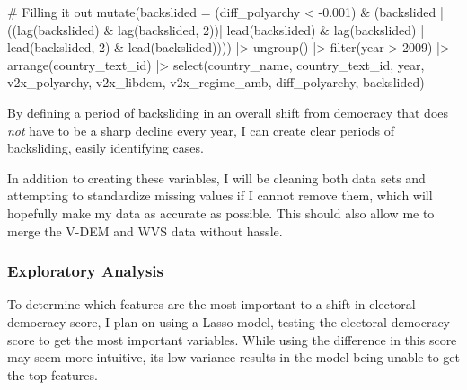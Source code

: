 \documentclass[
  letterpaper,
  DIV=11,
  numbers=noendperiod]{scrartcl}
\newenvironment{Shaded}{\begin{snugshade}}{\end{snugshade}}
\newcommand{\AttributeTok}[1]{\textcolor[rgb]{0.40,0.45,0.13}{#1}}
\newcommand{\CommentTok}[1]{\textcolor[rgb]{0.37,0.37,0.37}{#1}}
\newcommand{\DecValTok}[1]{\textcolor[rgb]{0.68,0.00,0.00}{#1}}
\newcommand{\FloatTok}[1]{\textcolor[rgb]{0.68,0.00,0.00}{#1}}
\newcommand{\FunctionTok}[1]{\textcolor[rgb]{0.28,0.35,0.67}{#1}}
\newcommand{\NormalTok}[1]{\textcolor[rgb]{0.00,0.23,0.31}{#1}}
\newcommand{\SpecialCharTok}[1]{\textcolor[rgb]{0.37,0.37,0.37}{#1}}
\begin{document}
\begin{Shaded}
\begin{Highlighting}[]
  \CommentTok{\# Filling it out}
  \FunctionTok{mutate}\NormalTok{(}\AttributeTok{backslided =}\NormalTok{ (diff\_polyarchy }\SpecialCharTok{\textless{}} \SpecialCharTok{{-}}\FloatTok{0.001}\NormalTok{) }\SpecialCharTok{\&}
\NormalTok{           (backslided }\SpecialCharTok{|}
\NormalTok{              ((}\FunctionTok{lag}\NormalTok{(backslided) }\SpecialCharTok{\&} \FunctionTok{lag}\NormalTok{(backslided, }\DecValTok{2}\NormalTok{))}\SpecialCharTok{|}
                 \FunctionTok{lead}\NormalTok{(backslided) }\SpecialCharTok{\&} \FunctionTok{lag}\NormalTok{(backslided) }\SpecialCharTok{|}
                 \FunctionTok{lead}\NormalTok{(backslided, }\DecValTok{2}\NormalTok{) }\SpecialCharTok{\&} \FunctionTok{lead}\NormalTok{(backslided)))) }\SpecialCharTok{|\textgreater{}}
  \FunctionTok{ungroup}\NormalTok{() }\SpecialCharTok{|\textgreater{}}
  \FunctionTok{filter}\NormalTok{(year }\SpecialCharTok{\textgreater{}} \DecValTok{2009}\NormalTok{) }\SpecialCharTok{|\textgreater{}}
  \FunctionTok{arrange}\NormalTok{(country\_text\_id) }\SpecialCharTok{|\textgreater{}}
  \FunctionTok{select}\NormalTok{(country\_name,}
\NormalTok{         country\_text\_id,}
\NormalTok{         year,}
\NormalTok{         v2x\_polyarchy,}
\NormalTok{         v2x\_libdem, }
\NormalTok{         v2x\_regime\_amb, }
\NormalTok{         diff\_polyarchy, }
\NormalTok{         backslided)}
\end{Highlighting}
\end{Shaded}

By defining a period of backsliding in an overall shift from democracy
that does \emph{not} have to be a sharp decline every year, I can create
clear periods of backsliding, easily identifying cases.

In addition to creating these variables, I will be cleaning both data
sets and attempting to standardize missing values if I cannot remove
them, which will hopefully make my data as accurate as possible. This
should also allow me to merge the V-DEM and WVS data without hassle.

\subsubsection{Exploratory Analysis}\label{exploratory-analysis}

To determine which features are the most important to a shift in
electoral democracy score, I plan on using a Lasso model, testing the
electoral democracy score to get the most important variables. While
using the difference in this score may seem more intuitive, its low
variance results in the model being unable to get the top features.
\end{document}
